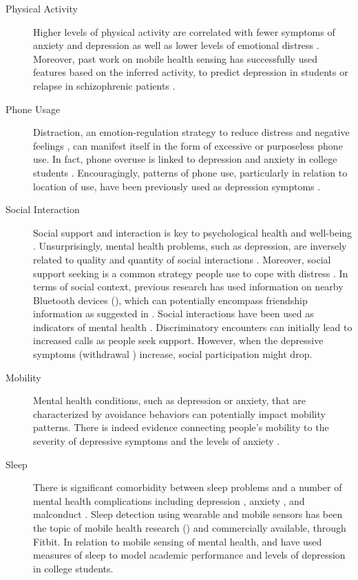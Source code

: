 \begin{description}
\item[Physical Activity]     Higher levels of physical activity are correlated with fewer symptoms of anxiety and depression \citep{Stephens:1988} as well as lower levels of emotional distress \citep{Steptoe:1996}. Moreover, past work on mobile health sensing has successfully used features based on the inferred activity, \eg to predict depression in students \citep{Wang:2018} or relapse in schizophrenic patients \citep{Wang:2016}. 
\item[Phone Usage] Distraction, an emotion-regulation strategy to reduce distress and negative feelings \citep{Sheppes:2011}, can manifest itself in the form of excessive or purposeless phone use. In fact, phone overuse is linked to depression and anxiety in college students \citep{Demirci:2015}. Encouragingly, patterns of phone use, particularly in relation to location of use, have been previously used as depression symptoms \citep{Wang:2018}.
\item[Social Interaction] Social support and interaction is key to psychological health and well-being \citep{Kawachi:2001}. Unsurprisingly, mental health problems, such as depression, are inversely related to quality and quantity of social interactions \citep{Nezlek:1994}. Moreover, social support seeking is a common strategy people use to cope with distress \citep{Carver:1997}.  In terms of social context, previous research has used information on nearby Bluetooth devices (\eg \cite{wang2014studentlife}), which can potentially encompass friendship information as suggested in \citep{Eagle:2009}. Social interactions have been used as indicators of mental health \citep{Wang:2016}.  
Discriminatory encounters can initially lead to increased calls as people seek support. However, when the depressive symptoms (\eg withdrawal \citep{Girard:2014}) increase, social participation might drop. 
\item[Mobility] Mental health conditions, such as depression or anxiety, that are characterized by avoidance behaviors can potentially impact mobility patterns. There is indeed evidence connecting people's mobility to the severity of depressive symptoms \citep{Saeb:2015, Saeb:2016} and the levels of anxiety \citep{Huang:2016}. 
\item[Sleep] There is significant comorbidity between sleep problems and a number of mental health complications including depression \citep{Vandeputte:2003}, anxiety \citep{Morrison:1992}, and malconduct \citep{Papadimitriou:2005}. Sleep detection using wearable and mobile sensors has been the topic of mobile health research (\eg \cite{Min:2014}) and commercially available, \eg through Fitbit. In relation to mobile sensing of mental health, \citet{wang2014studentlife} and \citet{Wang:2018} have used measures of sleep to model academic performance and levels of depression in college students. 
\end{description}

